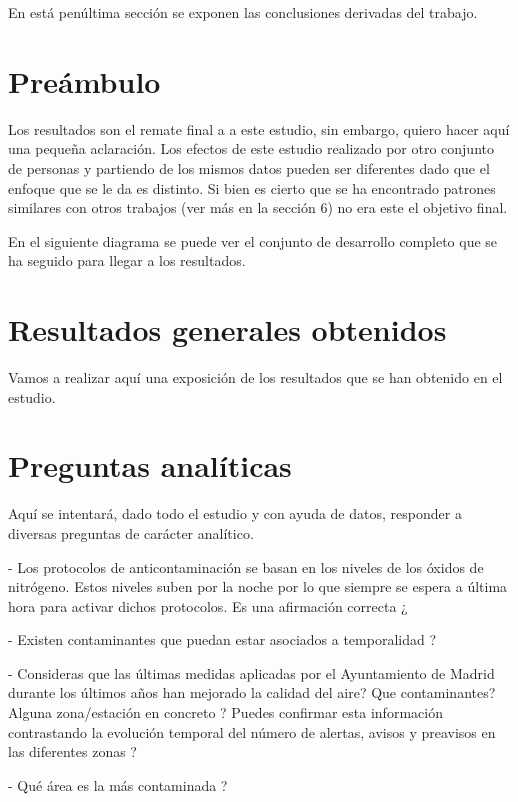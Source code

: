 
En está penúltima sección se exponen las conclusiones derivadas del trabajo. 



\section{Preámbulo}
Los resultados son el remate final a a este estudio, sin embargo, quiero hacer aquí una pequeña aclaración. Los efectos de este estudio realizado por otro conjunto de personas y partiendo de los mismos datos pueden ser diferentes dado que el enfoque que se le da es distinto. Si bien es cierto que se ha encontrado patrones similares con otros trabajos (ver más en la sección 6) no era este el objetivo final. 

En el siguiente diagrama se puede ver el conjunto de desarrollo completo que se ha seguido para llegar a los resultados.


\section{Resultados generales obtenidos}
Vamos a realizar aquí una exposición de los resultados que se han obtenido en el estudio.  

\section{Preguntas analíticas}

Aquí se intentará, dado todo el estudio y con ayuda de datos, responder a diversas preguntas de carácter analítico.


-          Los protocolos de anticontaminación se basan en los niveles de los óxidos de nitrógeno. Estos niveles suben por la noche por lo que siempre se espera a última hora para activar dichos protocolos. Es una afirmación correcta ¿

-          Existen contaminantes que puedan estar asociados a temporalidad ?

-          Consideras que las últimas medidas aplicadas por el Ayuntamiento de Madrid durante los últimos años han mejorado la calidad del aire? Que contaminantes? Alguna zona/estación en concreto ? Puedes confirmar esta información contrastando la evolución temporal del número de alertas, avisos y preavisos en las diferentes zonas ?

-          Qué área es la más contaminada ?